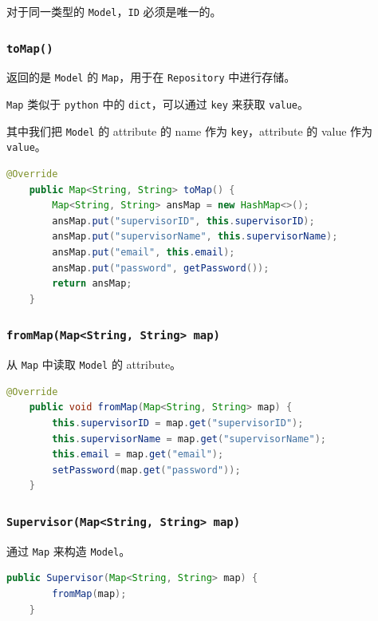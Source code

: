 \documentclass[hyperref,UTF8,12pt,a4paper]{ctexart}
\begin{document}
对于同一类型的 \texttt{Model}，\texttt{ID} 必须是唯一的。

\subsubsection{\texttt{toMap()}}

返回的是 \texttt{Model} 的 \texttt{Map}，用于在 \texttt{Repository} 中进行存储。

\texttt{Map} 类似于 \texttt{python} 中的 \texttt{dict}，可以通过 \texttt{key} 来获取 \texttt{value}。

其中我们把 \texttt{Model} 的 attribute 的 name 作为 \texttt{key}，attribute 的 value 作为 \texttt{value}。

\begin{lstlisting}[language=Java]
    @Override
    public Map<String, String> toMap() {
        Map<String, String> ansMap = new HashMap<>();
        ansMap.put("supervisorID", this.supervisorID);
        ansMap.put("supervisorName", this.supervisorName);
        ansMap.put("email", this.email);
        ansMap.put("password", getPassword());
        return ansMap;
    }
\end{lstlisting}


\subsubsection{\texttt{fromMap(Map<String, String> map)}}

从 \texttt{Map} 中读取 \texttt{Model} 的 attribute。

\begin{lstlisting}[language=Java]
    @Override
    public void fromMap(Map<String, String> map) {
        this.supervisorID = map.get("supervisorID");
        this.supervisorName = map.get("supervisorName");
        this.email = map.get("email");
		setPassword(map.get("password"));
    }
\end{lstlisting}

\subsubsection{\texttt{Supervisor(Map<String, String> map)}}

通过 \texttt{Map} 来构造 \texttt{Model}。

\begin{lstlisting}[language=Java]
	public Supervisor(Map<String, String> map) {
		fromMap(map);
	}
\end{lstlisting}
\end{document}

